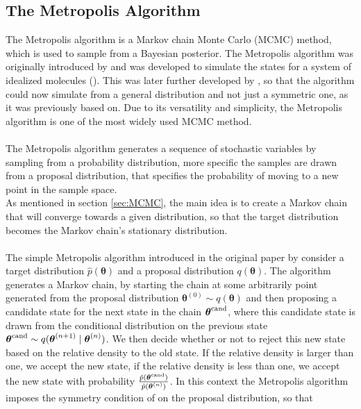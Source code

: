 \subsection{The Metropolis Algorithm} \label{sec:Metropolis}
The Metropolis algorithm is a Markov chain Monte Carlo (MCMC) method, which is used to sample from a Bayesian posterior. 
The Metropolis algorithm was originally introduced by \cite{Metropolis1953} and was developed to simulate the states for a system of idealized molecules (\cite{neal2012mcmc}). This was later further developed by \cite{hastings70}, so that the algorithm could now simulate from a general distribution and not just a symmetric one, as it was previously based on. Due to its versatility and simplicity, the Metropolis algorithm is one of the most widely used MCMC method.\\
\\
The Metropolis algorithm generates a sequence of stochastic variables by sampling from a probability distribution, more specific the samples are drawn from a proposal distribution, that specifies the probability of moving to a new point in the sample space. \\
As mentioned in section \ref{sec:MCMC}, the main idea is to create a Markov chain that will converge towards a given distribution, so that the target distribution becomes the Markov chain's stationary distribution.  \\
\\
The simple Metropolis algorithm introduced in the original paper by \cite{Metropolis1953} consider a target distribution $\hat{p}(\boldsymbol{\theta})$ and a proposal distribution $q(\boldsymbol{\theta})$. The algorithm generates a Markov chain, by starting the chain at some arbitrarily point generated from the proposal distribution $\boldsymbol{\theta}^{(0)}\sim q(\boldsymbol{\theta})$ and then proposing a candidate state for the next state in the chain $\boldsymbol{\theta}^{\text{\text{cand}}}$, where this candidate state is drawn from the conditional distribution on the previous state $\boldsymbol{\theta}^{\text{\text{cand}}}\sim q(\boldsymbol{\theta}^{(n+1)}\mid\boldsymbol{\theta}^{(n)})$. We then decide whether or not to reject this new state based on the relative density to the old state. If the relative density is larger than one, we accept the new state, if the relative density is less than one, we accept the new state with probability $\frac{\hat{p}(\boldsymbol{\theta}^{\text{\text{cand}}})}{\hat{p}(\boldsymbol{\theta}^{(n)})}$. In this context the Metropolis algorithm imposes the symmetry condition of on the proposal distribution, so that
